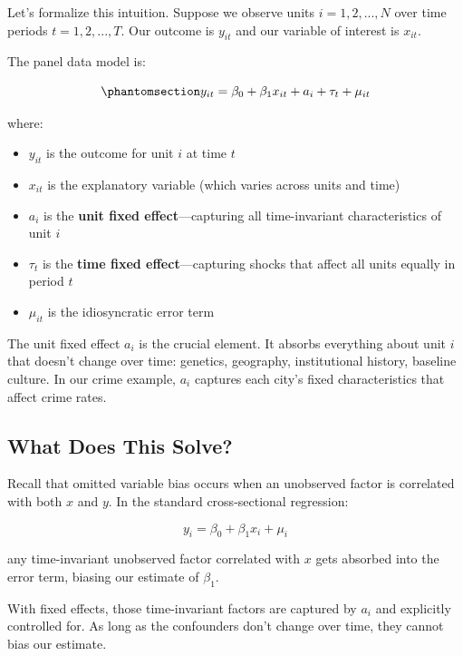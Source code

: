 \documentclass[
  letterpaper,
  DIV=11,
  numbers=noendperiod]{scrreprt}
\providecommand{\tightlist}{%
  \setlength{\itemsep}{0pt}\setlength{\parskip}{0pt}}
\begin{document}
Let's formalize this intuition. Suppose we observe units
\(i = 1, 2, ..., N\) over time periods \(t = 1, 2, ..., T\). Our outcome
is \(y_{it}\) and our variable of interest is \(x_{it}\).

The panel data model is:

\begin{equation}\protect\phantomsection\label{eq-panel-model}{
y_{it} = \beta_0 + \beta_1 x_{it} + a_i + \tau_t + \mu_{it}
}\end{equation}

where:

\begin{itemize}
\tightlist
\item
  \(y_{it}\) is the outcome for unit \(i\) at time \(t\)
\item
  \(x_{it}\) is the explanatory variable (which varies across units and
  time)
\item
  \(a_i\) is the \textbf{unit fixed effect}---capturing all
  time-invariant characteristics of unit \(i\)
\item
  \(\tau_t\) is the \textbf{time fixed effect}---capturing shocks that
  affect all units equally in period \(t\)
\item
  \(\mu_{it}\) is the idiosyncratic error term
\end{itemize}

The unit fixed effect \(a_i\) is the crucial element. It absorbs
everything about unit \(i\) that doesn't change over time: genetics,
geography, institutional history, baseline culture. In our crime
example, \(a_i\) captures each city's fixed characteristics that affect
crime rates.

\subsection{What Does This Solve?}\label{what-does-this-solve}

Recall that omitted variable bias occurs when an unobserved factor is
correlated with both \(x\) and \(y\). In the standard cross-sectional
regression:

\[
y_i = \beta_0 + \beta_1 x_i + \mu_i
\]

any time-invariant unobserved factor correlated with \(x\) gets absorbed
into the error term, biasing our estimate of \(\beta_1\).

With fixed effects, those time-invariant factors are captured by \(a_i\)
and explicitly controlled for. As long as the confounders don't change
over time, they cannot bias our estimate.
\end{document}
